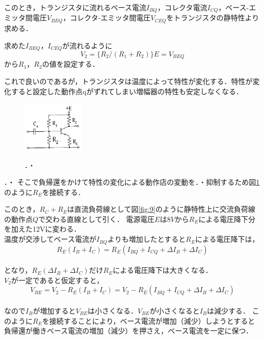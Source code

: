 \documentclass[10pt, a4j, dvipdfmx]{jarticle}
\begin{document}
    このとき，トランジスタに流れるベース電流$I_{BQ}$，コレクタ電流$I_{CQ}$，ベース-エミッタ間電圧$V_{BEQ}$，コレクタ-エミッタ間電圧$V_{CEQ}$をトランジスタの静特性より求める．

    求めた$I_{BEQ}$，$I_{CEQ}$が流れるように
    \begin{equation}
        V_2 = \{R_2 / (R_1 + R_2)\} E = V_{BEQ}
    \end{equation}
    から$R_1$，$R_2$の値を設定する．

    これで良いのであるが，トランジスタは温度によって特性が変化する．特性が変化すると設定した動作点qがずれてしまい増幅器の特性も安定しなくなる．\\
    \begin{figure}
        \vspace*{-\intextsep}
        \begin{center}
            \includegraphics[width=30mm]{fig-12.png}
            \caption{}
            \label{fig:11}
        \end{center}．・
    \end{figure}．・
    そこで負帰還をかけて特性の変化による動作店の変動を．・抑制するため図\ref{fig:11}のように$R_E$を接続する．

    このとき，$R_C + R_E$は直流負荷線として図\ref{fig:9}のように静特性上に交流負荷線の動作点$Q$で交わる直線として引く．
    電源電圧$E$は$8V$から$R_E$による電圧降下分を加えた12Vに変わる．\\
    温度が交渉してベース電流が$I_{BQ}$よりも増加したとすると$R_E$による電圧降下は，
    \begin{equation}
        R_E(I_B + I_C) = R_E(I_{BQ} + I_{CQ} + \Delta I_B + \Delta I_C)
    \end{equation}\\
    となり，$R_E(\Delta I_B + \Delta I_C)$だけ$R_E$による電圧降下は大きくなる．\\
    $V_2$が一定であると仮定すると，
    \begin{equation}
        V_{BE} = V_2 - R_E(I_B + I_C) = V_2 - R_E(I_{BQ} + I_{CQ} + \Delta I_B + \Delta I_C)
    \end{equation}\\
    なので$I_B$が増加すると$V_{BE}$は小さくなる．$V_{BE}$が小さくなると$I_B$は減少する．
    このように$R_E$を接続することにより，ベース電流が増加（減少）しようとすると負帰還が働きベース電流の増加（減少）を押さえ，ベース電流を一定に保つ．
\end{document}
